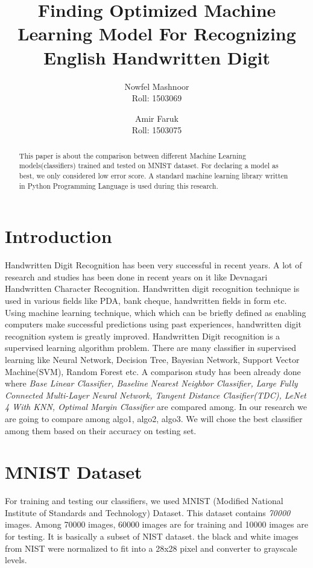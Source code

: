 \documentclass[12pt,a4paper]{article}
\title{Finding Optimized Machine Learning Model For Recognizing English Handwritten Digit}
\author{Nowfel Mashnoor\\Roll: 1503069\and Amir Faruk\\Roll: 1503075}
\begin{document}
\date{}
\maketitle

\begin{abstract}
This paper is about the comparison between different Machine Learning models(classifiers) trained and tested on MNIST dataset. For declaring a model as best, we only considered low error score. A standard machine learning library written in Python Programming Language is used during this research. 
\end{abstract}

\section{Introduction}

Handwritten Digit Recognition has been very successful in recent years. A lot of research and studies has been done in recent years on it like Devnagari Handwritten Character Recognition\cite{pal2009comparative}. Handwritten digit recognition technique is used in various fields like PDA, bank cheque, handwritten fields in form etc.\cite{plamondon2000online} Using machine learning technique, which which can be briefly defined as enabling computers make successful predictions using past experiences, \cite{bacstanlar2014introduction} handwritten digit recognition system is greatly improved. Handwritten Digit recognition is a supervised learning algorithm problem. There are many classifier in supervised learning like Neural Network, Decision Tree,  Bayesian Network, Support Vector Machine(SVM), Random Forest etc\cite{kotsiantis2007supervised}. A comparison study has been already done where \textit{Base Linear Classifier, Baseline Nearest Neighbor Classifier, Large Fully Connected Multi-Layer Neural Network, Tangent Distance Clasifier(TDC), LeNet 4 With KNN, Optimal Margin Classifier} are compared among.\cite{lecun1995learning} In our research we are going to compare among algo1, algo2, algo3. We will chose the best classifier among them based on their accuracy on testing set. 

\section{MNIST Dataset}

For training and testing our classifiers, we used MNIST (Modified National Institute of Standards and Technology) Dataset. This dataset contains \textit{70000} images. Among 70000 images, 60000 images are for training and 10000 images are for testing\cite{kussul2004improved}.  It is basically a subset of NIST dataset. the black and white images from NIST were normalized to fit into a 28x28 pixel and converter to grayscale levels.\cite{lecuncourant}
\end{document}

